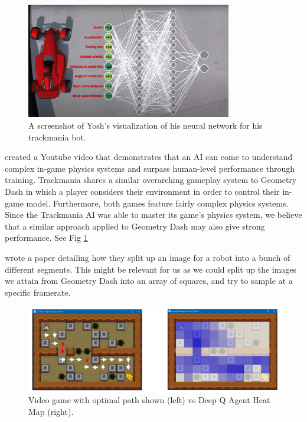 \documentclass{article} %
\begin{document}
\begin{figure}[!h]
\begin{center}
\includegraphics[width=0.8\textwidth]{Figs/Trackmania_AI_neural_network.png}
\end{center}
\caption{A screenshot of Yosh's visualization of his neural network
for his trackmania bot. 
\citep{Trackmania+AI}}
\label{fig:Trackmania_AI}
\end{figure}

\cite{Trackmania+AI} created a Youtube video that demonstrates that 
an AI can come to understand complex in-game physics systems and surpass
human-level performance through training. Trackmania shares a similar 
overarching gameplay system to Geometry Dash in which a player considers 
their environment in order to control their in-game model. Furthermore, both 
games feature fairly complex physics systems. Since the Trackmania AI was 
able to master its game’s physics system, we believe that a similar approach 
applied to Geometry Dash may also give strong performance. See Fig \ref{fig:Trackmania_AI}

\cite{Robot+Object+Avoidance+Method} wrote a paper detailing how 
they split up an image for a robot into a bunch of different segments. 
This might be relevant for us as we could split up the images we attain
from Geometry Dash into an array of squares, and try to sample at a
specific framerate.

\begin{figure}[!h]
\begin{center}
\includegraphics[width=1.0\textwidth]{Figs/Q_Learn_Game.png}
\end{center}
\caption{Video game with optimal path shown (left) vs Deep Q Agent Heat Map 
(right). \citep{General+Video+Game+AI:+Learning+from+Screen+Capture}}
\label{fig:Q_Learn_game}
\end{figure}
\end{document}
